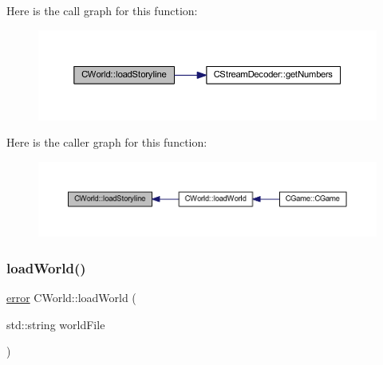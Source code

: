 Here is the call graph for this function\+:\nopagebreak
\begin{figure}[H]
\begin{center}
\leavevmode
\includegraphics[width=350pt]{class_c_world_a6a4774ff3ee94df11d82260a27065885_cgraph}
\end{center}
\end{figure}
Here is the caller graph for this function\+:\nopagebreak
\begin{figure}[H]
\begin{center}
\leavevmode
\includegraphics[width=350pt]{class_c_world_a6a4774ff3ee94df11d82260a27065885_icgraph}
\end{center}
\end{figure}
\mbox{\label{class_c_world_a944f12acb1ff76beed2648647ff19d0f}} 
\subsubsection{\texorpdfstring{load\+World()}{loadWorld()}}
{\footnotesize\ttfamily \mbox{\hyperlink{_errors_list_8h_af10dacfa214e2575bb2e0ee407c242e0}{error}} C\+World\+::load\+World (\begin{DoxyParamCaption}\item[{std\+::string}]{world\+File }\end{DoxyParamCaption})}

